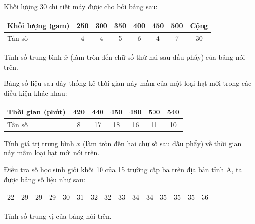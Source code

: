 \begin{bt}
	Khối lượng 30 chi tiết máy được cho bởi bảng sau:
	\begin{center}
	\begin{tabular}{|l|c|c|c|c|c|c|c|}
		\hline
		Khối lượng (gam) & 250 & 300 & 350 & 400 & 450 & 500 & Cộng \\
		\hline
		Tần số & 4 & 4 & 5 & 6 & 4 & 7 & 30 \\
		\hline
	\end{tabular}
	\end{center}
	Tính số trung bình $\overline{x}$ (làm tròn đến chữ số thứ hai sau dấu phẩy) của bảng nói trên.
\end{bt}

\begin{bt}
	Bảng số liệu sau đây thống kê thời gian nảy mầm của một loại hạt mới trong các điều kiện khác nhau:
	\begin{center}
	\begin{tabular}{|l|c|c|c|c|c|c|}
		\hline
		Thời gian (phút) & 420 & 440 & 450 & 480 & 500 & 540 \\
		\hline
		Tần số & 8 & 17 & 18 & 16 & 11 & 10 \\
		\hline
	\end{tabular}
	\end{center}
	Tính giá trị trung bình $\overline{x}$ (làm tròn đến hai chữ số sau dấu phẩy) về thời gian nảy mầm loại hạt mới nói trên.
\end{bt}

\begin{bt}
	Điều tra số học sinh giỏi khối 10 của 15 trường cấp ba trên địa bàn tỉnh A, ta được bảng số liệu như sau:
	\begin{center}
	\begin{tabular}{ccccccccccccccc}
		22 & 29 & 29 & 29 & 30 & 31 & 32 & 32 & 33 & 34 & 34 & 35 & 35 & 35 & 36
	\end{tabular}
	\end{center}
	Tính số trung vị của bảng nói trên.
\end{bt}

